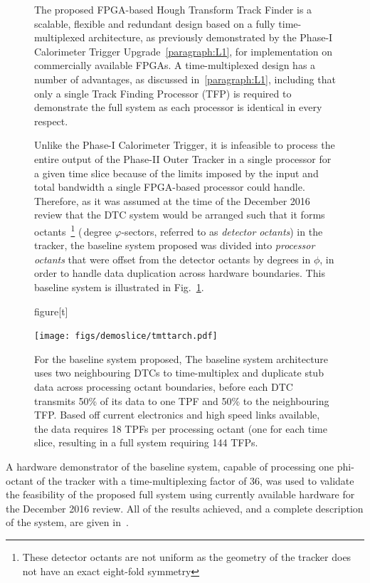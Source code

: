 \begin{figure}[tb]
The proposed FPGA-based Hough Transform Track Finder is a scalable, flexible and redundant design based on a fully time-multiplexed architecture, as previously demonstrated by the Phase-I Calorimeter Trigger Upgrade~\ref{paragraph:L1}, for implementation on commercially available FPGAs.
A time-multiplexed design has a number of advantages, as discussed in~\ref{paragraph:L1}, including that only a single Track Finding Processor (TFP) is required to demonstrate the full system as each processor is identical in every respect.

Unlike the Phase-I Calorimeter Trigger, it is infeasible to process the entire output of the Phase-II Outer Tracker in a single processor for a given time slice because of the limits imposed by the input and total bandwidth a single FPGA-based processor could handle.
Therefore, as it was assumed at the time of the December 2016 review that the DTC system would be arranged such that it forms octants~\footnote{These detector octants are not uniform as the geometry of the tracker does not have an exact eight-fold symmetry} (\,degree $\varphi$-sectors, referred to as \emph {detector octants}) in the tracker, the baseline system proposed was divided into \emph{processor octants} that were offset from the detector octants by  degrees in $\phi$, in order to handle data duplication across hardware boundaries.
This baseline system is illustrated in Fig.~\ref{fig:tmttarch}.

{figure}[t]
\begin{center}
\texttt{[image: figs/demoslice/tmttarch.pdf]}
\caption{For the baseline system proposed, 
The baseline system architecture uses two neighbouring DTCs to time-multiplex and duplicate stub data across processing octant boundaries, before each DTC transmits 50\% of its data to one TPF and 50\% to the neighbouring TFP.
Based off current electronics and high speed links available, the data requires 18 TPFs per processing octant (one for each time slice, resulting in a full system requiring 144 TFPs.}
\label{fig:tmttarch}
\end{center}
\end{figure}

A hardware demonstrator of the baseline system, capable of processing one phi-octant of the tracker with a time-multiplexing factor of 36, was used to validate the feasibility of the proposed full system using currently available hardware for the December 2016 review.
All of the results achieved, and a complete description of the system, are given in~\cite{TMTT_JINST}.

